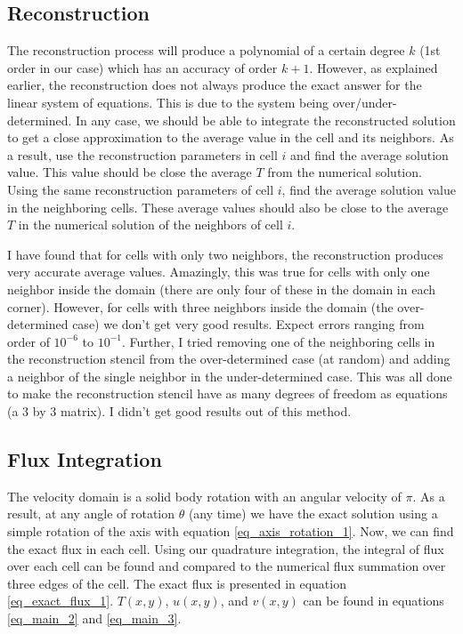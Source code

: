 \documentclass{article}
\begin{document}
\subsection{Reconstruction}
The reconstruction process will produce a polynomial of a certain degree $k$ (1st order in our case) which has an accuracy of order $k+1$. However, as explained earlier, the reconstruction does not always produce the exact answer for the linear system of equations. This is due to the system being over/under-determined. In any case, we should be able to integrate the reconstructed solution to get a close approximation to the average value in the cell and its neighbors. As a result, use the reconstruction parameters in cell $i$ and find the average solution value. This value should be close the average $T$ from the numerical solution. Using the same reconstruction parameters of cell $i$, find the average solution value in the neighboring cells. These average values should also be close to the average $T$ in the numerical solution of the neighbors of cell $i$.

I have found that for cells with only two neighbors, the reconstruction produces very accurate average values. Amazingly, this was true for cells with only one neighbor inside the domain (there are only four of these in the domain in each corner). However, for cells with three neighbors inside the domain (the over-determined case) we don't get very good results. Expect errors ranging from order of $10^{-6}$ to $10^{-1}$. Further, I tried removing one of the neighboring cells in the reconstruction stencil from the over-determined case (at random) and adding a neighbor of the single neighbor in the under-determined case. This was all done to make the reconstruction stencil have as many degrees of freedom as equations (a 3 by 3 matrix). I didn't get good results out of this method.

\subsection{Flux Integration}
The velocity domain is a solid body rotation with an angular velocity of $\pi$. As a result, at any angle of rotation $\theta$ (any time) we have the exact solution using a simple rotation of the axis with equation \ref{eq_axis_rotation_1}. Now, we can find the exact flux in each cell. Using our quadrature integration, the integral of flux over each cell can be found and compared to the numerical flux summation over three edges of the cell. The exact flux is presented in equation \ref{eq_exact_flux_1}. $T(x,y)$, $u(x,y)$, and $v(x,y)$ can be found in equations \ref{eq_main_2} and \ref{eq_main_3}.
\end{document}
